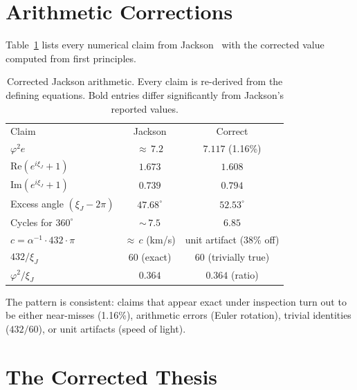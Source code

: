 \documentclass[
  aps,
  prd,
  twocolumn,
  superscriptaddress,
  nofootinbib,
  floatfix
]{revtex4-2}
\newcommand{\xiJ}{\xi_J}
\begin{document}
\section{Arithmetic Corrections}
\label{sec:corrections}

Table~\ref{tab:corrections} lists every numerical claim from
Jackson~\cite{jackson2026curved} with the corrected value computed
from first principles.

\begin{table}[h]
\caption{Corrected Jackson arithmetic.  Every claim is re-derived from
the defining equations.  Bold entries differ significantly from Jackson's
reported values.}
\label{tab:corrections}
\begin{ruledtabular}
\begin{tabular}{lcc}
\textrm{Claim} & \textrm{Jackson} & \textrm{Correct} \\
\colrule
$\varphi^2 e$                    & ${\approx}\,7.2$   & $\mathbf{7.117}$ (1.16\%) \\
$\mathrm{Re}(e^{i\xiJ}+1)$      & $1.673$          & $\mathbf{1.608}$              \\
$\mathrm{Im}(e^{i\xiJ}+1)$      & $0.739$          & $\mathbf{0.794}$              \\
Excess angle $(\xiJ - 2\pi)$     & $47.68^\circ$    & $\mathbf{52.53}^\circ$        \\
Cycles for $360^\circ$           & ${\sim}\,7.5$     & $\mathbf{6.85}$               \\
$c = \alpha^{-1}{\cdot}432{\cdot}\pi$ & ${\approx}\,c$ (km/s) & unit artifact (38\% off) \\
$432/\xiJ$                       & $60$ (exact)     & $60$ (trivially true)         \\
$\varphi^2/\xiJ$                 & $0.364$          & $0.364$ (ratio)               \\
\end{tabular}
\end{ruledtabular}
\end{table}

The pattern is consistent: claims that appear exact under inspection turn
out to be either near-misses (1.16\%), arithmetic errors (Euler rotation),
trivial identities ($432/60$), or unit artifacts (speed of light).

\section{The Corrected Thesis}
\label{sec:thesis}
\end{document}
